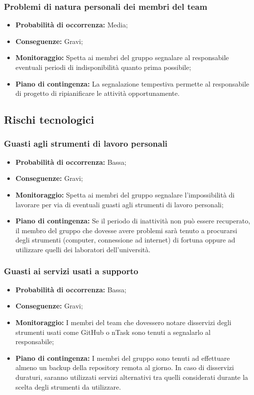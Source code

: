 \subsubsection{Problemi di natura personali dei membri del team}
\begin{itemize}
\item \textbf{Probabilità di occorrenza:} Media;
\item \textbf{Conseguenze:} Gravi;
\item \textbf{Monitoraggio:} Spetta ai membri del gruppo segnalare al responsabile eventuali periodi di indisponibilità quanto prima possibile;
\item \textbf{Piano di contingenza:} La segnalazione tempestiva permette al responsabile di progetto di ripianificare le attività opportunamente.
\end{itemize}
\subsection{Rischi tecnologici}
\subsubsection{Guasti agli strumenti di lavoro personali}
\begin{itemize}
\item \textbf{Probabilità di occorrenza:} Bassa;
\item \textbf{Conseguenze:} Gravi;
\item \textbf{Monitoraggio:} Spetta ai membri del gruppo segnalare l'impossibilità di lavorare per via di eventuali guasti agli strumenti di lavoro personali;
\item \textbf{Piano di contingenza:} Se il periodo di inattività non può essere recuperato, il membro del gruppo che dovesse avere problemi sarà tenuto a procurarsi degli strumenti (computer, connessione ad internet) di fortuna oppure ad utilizzare quelli dei laboratori dell'università.
\end{itemize}
\subsubsection{Guasti ai servizi usati a supporto}
\begin{itemize}
\item \textbf{Probabilità di occorrenza:} Bassa;
\item \textbf{Conseguenze:} Gravi;
\item \textbf{Monitoraggio:} I membri del team che dovessero notare disservizi degli strumenti usati come GitHub o nTask sono tenuti a segnalarlo al responsabile;
\item \textbf{Piano di contingenza:} I membri del gruppo sono tenuti ad effettuare almeno un backup della repository remota al giorno. In caso di disservizi duraturi, saranno utilizzati servizi alternativi tra quelli considerati	durante la scelta degli strumenti da utilizzare.
\end{itemize}
